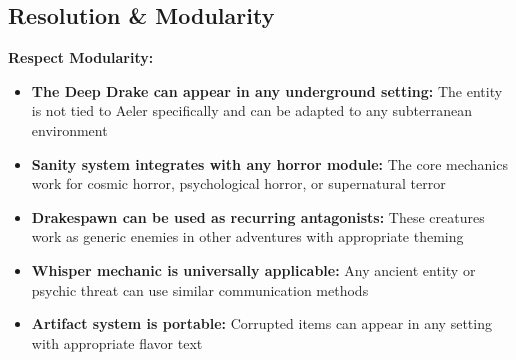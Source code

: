 \documentclass[11pt]{article}
\begin{document}
\begin{itemize}
\begin{itemize}
\begin{itemize}
\begin{itemize}
\begin{itemize}
\section{Resolution & Modularity}

\textbf{Respect Modularity:} \begin{itemize} \item \textbf{The Deep Drake can appear in any underground setting:} The entity is not tied to Aeler specifically and can be adapted to any subterranean environment \item \textbf{Sanity system integrates with any horror module:} The core mechanics work for cosmic horror, psychological horror, or supernatural terror \item \textbf{Drakespawn can be used as recurring antagonists:} These creatures work as generic enemies in other adventures with appropriate theming \item \textbf{Whisper mechanic is universally applicable:} Any ancient entity or psychic threat can use similar communication methods \item \textbf{Artifact system is portable:} Corrupted items can appear in any setting with appropriate flavor text \end{itemize}


\end{itemize}
\end{itemize}
\end{itemize}
\end{itemize}
\end{itemize}
\end{document}
